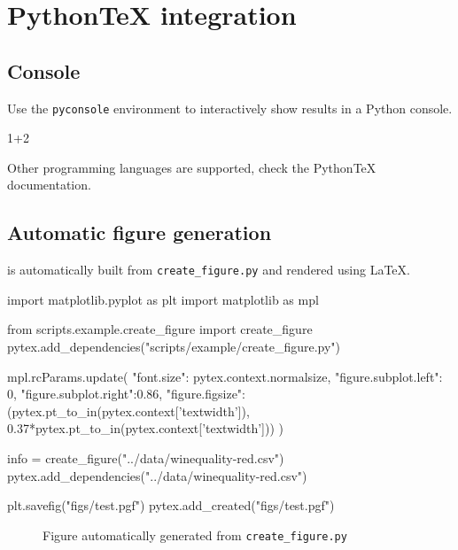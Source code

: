
\chapter{Python\TeX{} integration}

\section{Console}

Use the \texttt{pyconsole} environment to interactively show results in a Python console.

\begin{pyconsole}
1+2
\end{pyconsole}
Other programming languages are supported, check the Python\TeX{} documentation.

\section{Automatic figure generation}

 is automatically built from \texttt{create\_figure.py} and rendered using \LaTeX.

\begin{pycode}
import matplotlib.pyplot as plt
import matplotlib as mpl

from scripts.example.create_figure import create_figure
pytex.add_dependencies("scripts/example/create_figure.py")

mpl.rcParams.update({
    "font.size":           pytex.context.normalsize,
    "figure.subplot.left": 0,
    "figure.subplot.right":0.86,
    "figure.figsize":      (pytex.pt_to_in(pytex.context['textwidth']),
                            0.37*pytex.pt_to_in(pytex.context['textwidth']))
})

info = create_figure("../data/winequality-red.csv")
pytex.add_dependencies("../data/winequality-red.csv")

plt.savefig("figs/test.pgf")
pytex.add_created("figs/test.pgf")
\end{pycode}

\begin{figure}[htbp]
    \centering
    \caption{Figure automatically generated from \texttt{create\_figure.py}}
    \label{fig:automatic-figure}
\end{figure}

